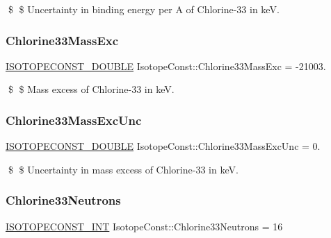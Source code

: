 \$ \$ Uncertainty in binding energy per A of Chlorine-\/33 in keV. \mbox{\label{group___isotope_const-_chlorine-_cl33_ga2cf6bba1017e0f0635930677cd1a5cfa}} 
\subsubsection{\texorpdfstring{Chlorine33\+Mass\+Exc}{Chlorine33MassExc}}
{\footnotesize\ttfamily \mbox{\hyperlink{group___isotope_const-_macros_ga8f45a7272ce02c0b4c65c44636ed719a}{I\+S\+O\+T\+O\+P\+E\+C\+O\+N\+S\+T\+\_\+\+D\+O\+U\+B\+LE}} Isotope\+Const\+::\+Chlorine33\+Mass\+Exc = -\/21003.}

\$ \$ Mass excess of Chlorine-\/33 in keV. \mbox{\label{group___isotope_const-_chlorine-_cl33_ga7187a77eb97be830b2961e72d1f16968}} 
\subsubsection{\texorpdfstring{Chlorine33\+Mass\+Exc\+Unc}{Chlorine33MassExcUnc}}
{\footnotesize\ttfamily \mbox{\hyperlink{group___isotope_const-_macros_ga8f45a7272ce02c0b4c65c44636ed719a}{I\+S\+O\+T\+O\+P\+E\+C\+O\+N\+S\+T\+\_\+\+D\+O\+U\+B\+LE}} Isotope\+Const\+::\+Chlorine33\+Mass\+Exc\+Unc = 0.}

\$ \$ Uncertainty in mass excess of Chlorine-\/33 in keV. \mbox{\label{group___isotope_const-_chlorine-_cl33_ga9209f8496e9f60d821547fe57e69eba3}} 
\subsubsection{\texorpdfstring{Chlorine33\+Neutrons}{Chlorine33Neutrons}}
{\footnotesize\ttfamily \mbox{\hyperlink{group___isotope_const-_macros_ga5f18360b3e99483a35c32d789e62621c}{I\+S\+O\+T\+O\+P\+E\+C\+O\+N\+S\+T\+\_\+\+I\+NT}} Isotope\+Const\+::\+Chlorine33\+Neutrons = 16}

